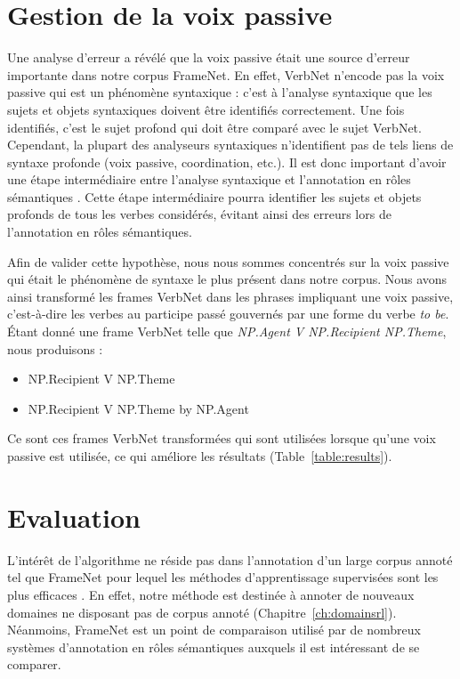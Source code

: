 \section{Gestion de la voix passive}
\label{sec:passif}

Une analyse d'erreur a révélé que la voix passive était une source d'erreur
importante dans notre corpus FrameNet. En effet, VerbNet n'encode pas la voix
passive qui est un phénomène syntaxique : c'est à l'analyse syntaxique que les
sujets et objets syntaxiques doivent être identifiés correctement. Une fois
identifiés, c'est le sujet profond qui doit être comparé avec le sujet VerbNet.
Cependant, la plupart des analyseurs syntaxiques n'identifient pas de tels
liens de syntaxe profonde (voix passive, coordination, etc.). Il est donc
important d'avoir une étape intermédiaire entre l'analyse syntaxique et
l'annotation en rôles sémantiques \citep{bonfante2011modular,
ribeyre2013systeme}. Cette étape intermédiaire pourra identifier les sujets et
objets profonds de tous les verbes considérés, évitant ainsi des erreurs lors
de l'annotation en rôles sémantiques. 

Afin de valider cette hypothèse, nous nous sommes concentrés sur la voix
passive qui était le phénomène de syntaxe le plus présent dans notre corpus.
Nous avons ainsi transformé les frames VerbNet dans les phrases impliquant une
voix passive, c'est-à-dire les verbes au participe passé gouvernés par une
forme du verbe \emph{to be}. Étant donné une frame VerbNet telle que
\textit{NP.Agent V NP.Recipient NP.Theme}, nous produisons :

\begin{itemize}
    \item NP.Recipient V NP.Theme
    \item NP.Recipient V NP.Theme by NP.Agent
\end{itemize}

Ce sont ces frames VerbNet transformées qui sont utilisées lorsque qu'une voix
passive est utilisée, ce qui améliore les résultats (Table~\ref{table:results}).

\section{Evaluation}
\label{srl:evaluation}

L'intérêt de l'algorithme ne réside pas dans l'annotation d'un large corpus
annoté tel que FrameNet pour lequel les méthodes d'apprentissage supervisées
sont les plus efficaces \citep{das2014frame}. En effet, notre méthode est
destinée à annoter de nouveaux domaines ne disposant pas de corpus annoté
(Chapitre~\ref{ch:domainsrl}). Néanmoins, FrameNet est un point de comparaison
utilisé par de nombreux systèmes d'annotation en rôles sémantiques auxquels il
est intéressant de se comparer.

